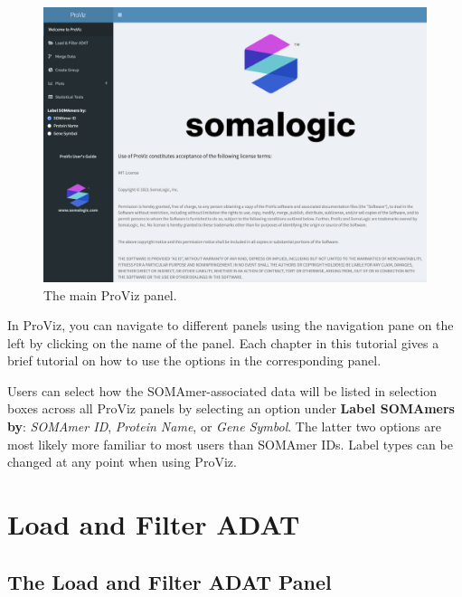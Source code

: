\documentclass[
]{book}
\begin{document}
\begin{figure}
\centering
\includegraphics{images/ProViz_main.png}
\caption{The main ProViz panel.}
\end{figure}

In ProViz, you can navigate to different panels using the navigation pane on the left by clicking on the name of the panel. Each chapter in this tutorial gives a brief tutorial on how to use the options in the corresponding panel.

Users can select how the SOMAmer-associated data will be listed in selection boxes across all ProViz panels by selecting an option under \textbf{Label SOMAmers by}: \emph{SOMAmer ID}, \emph{Protein Name}, or \emph{Gene Symbol}. The latter two options are most likely more familiar to most users than SOMAmer IDs. Label types can be changed at any point when using ProViz.

\hypertarget{load-and-filter-adat}{%
\chapter{Load and Filter ADAT}\label{load-and-filter-adat}}

\hypertarget{the-load-and-filter-adat-panel}{%
\section{The Load and Filter ADAT Panel}\label{the-load-and-filter-adat-panel}}
\end{document}
